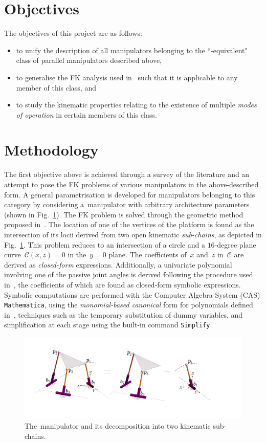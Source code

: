 \documentclass[DD,synopsis]{iitmdiss}
\begin{document}
\section{Objectives}
The objectives of this project are as follows:
\begin{itemize} 
	\item to unify the description of all manipulators belonging to the ``\rps-equivalent" class of parallel manipulators described above, 
	\item to generalise the FK analysis used in~\cite{tk2017a} such that it is applicable to any member of this class, and 
	\item to study the kinematic properties relating to the existence of multiple \emph{modes of operation} in certain members of this class.
\end{itemize}
\section{Methodology}
The first objective above is achieved through a survey of the literature and an attempt to pose the FK problems of various manipulators in the above-described form. A general parametrisation is developed for manipulators belonging to this category by considering a~\rps manipulator with arbitrary architecture parameters (shown in Fig.~\ref{fg:rpssplit}). The FK problem is solved through the geometric method proposed in~\cite{tk2017a}. The location of one of the vertices of the platform is found as the intersection of its locii derived from two open kinematic \emph{sub-chains}, as depicted in Fig.~\ref{fg:rpssplit}. This problem reduces to an intersection of a circle and a $16$-degree plane curve~\mbox{$\mathcal{C}(x, z) = 0$} in the~\mbox{$y = 0$} plane. The coefficients of~$x$ and~$z$ in~$\mathcal{C}$ are derived as \emph{closed-form} expressions. Additionally, a univariate polynomial involving one of the passive joint angles is derived following the procedure used in~\cite{srivatsan2014}, the coefficients of which are found as closed-form symbolic expressions. Symbolic computations are performed with the Computer Algebra System (CAS) \verb|Mathematica|, using the \emph{monomial-based canonical} form for polynomials defined in~\cite{sbagmmt06}, techniques such as the temporary substitution of dummy variables, and simplification at each stage using the built-in command \verb|Simplify|.\\
\begin{figure}[b]
	\centering
	\includegraphics[width=1\textwidth]{rpssplit.png}
	\caption{The~\rps manipulator and its decomposition into two kinematic sub-chains.}
	\label{fg:rpssplit}
\end{figure}
\end{document}
